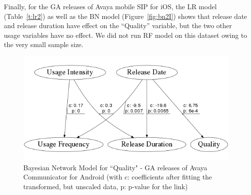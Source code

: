 \documentclass[smallcondensed]{svjour3}     %
\begin{document}
Finally, for the GA releases of Avaya mobile SIP for iOS, the LR model (Table~\ref{t:lr2}) as well as the BN model (Figure~\ref{fig:bn2I})  shows that release date and release duration have effect on the ``Quality'' variable, but the two other usage variables have no effect. We did not run RF model on this dataset owing to the very small sample size.



\begin{table}[ht]
\vspace{-10pt}
\caption{Summary Result of LR Model for ``Quality"}
\label{t:lr2}
\vspace{-10pt}
\end{table}


\begin{figure}[!t]
\centering
\includegraphics[width=0.6\linewidth]{qAGA}%
\caption{Bayesian Network  Model for ``Quality" - GA releases of Avaya Communicator for Android (with c: coefficients after fitting the transformed, but unscaled data, p: p-value  for the link)}
\label{fig:bn2AGA}
\vspace{-10pt}
\end{figure}
\end{document}
